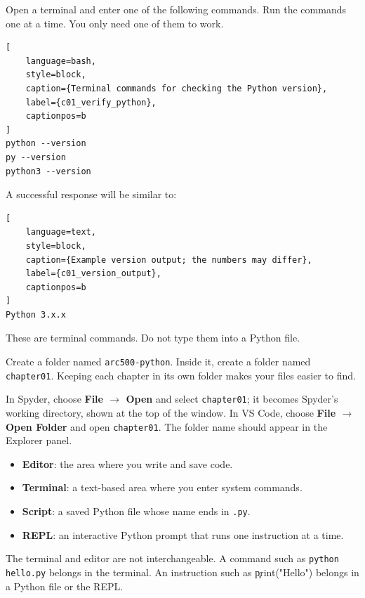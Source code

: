 
Open a terminal and enter one of the following commands. Run the commands one
at a time. You only need one of them to work.

\begin{lstlisting}[
    language=bash,
    style=block,
    caption={Terminal commands for checking the Python version},
    label={c01_verify_python},
    captionpos=b
]
python --version
py --version
python3 --version
\end{lstlisting}

A successful response will be similar to:

\begin{lstlisting}[
    language=text,
    style=block,
    caption={Example version output; the numbers may differ},
    label={c01_version_output},
    captionpos=b
]
Python 3.x.x
\end{lstlisting}

These are terminal commands. Do not type them into a Python file.


Create a folder named \texttt{arc500-python}. Inside it, create a folder named
\texttt{chapter01}. Keeping each chapter in its own folder makes your files
easier to find.

In Spyder, choose \textbf{File $\rightarrow$ Open} and select
\texttt{chapter01}; it becomes Spyder's working directory, shown at the top
of the window. In VS Code, choose \textbf{File $\rightarrow$ Open Folder} and
open \texttt{chapter01}. The folder name should appear in the Explorer panel.


\begin{itemize}
    \item \textbf{Editor}: the area where you write and save code.
    \item \textbf{Terminal}: a text-based area where you enter system commands.
    \item \textbf{Script}: a saved Python file whose name ends in \texttt{.py}.
    \item \textbf{REPL}: an interactive Python prompt that runs one instruction at a time.
\end{itemize}

The terminal and editor are not interchangeable. A command such as
\texttt{python hello.py} belongs in the terminal. An instruction such as
\c{print("Hello")} belongs in a Python file or the REPL.

